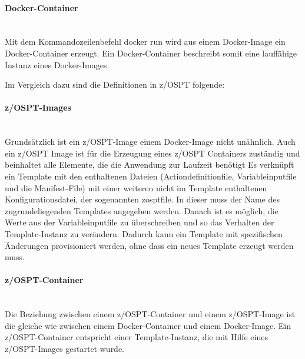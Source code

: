 \paragraph{\glqq Docker-Container\grqq}~\\
Mit dem Kommandozeilenbefehl \glqq docker run\grqq{} wird aus einem Docker-Image ein Docker-Container erzeugt.
Ein Docker-Container beschreibt somit eine lauffähige Instanz eines Docker-Images.
\cite[Kap. 1]{Vohra.2016}

Im Vergleich dazu sind die Definitionen in z/OSPT folgende:

\paragraph{\glqq z/OSPT-Images\grqq}~\\
Grundsätzlich ist ein z/OSPT-Image einem Docker-Image nicht unähnlich.
Auch ein z/OSPT Image ist für die Erzeugung eines z/OSPT Containers zuständig und beinhaltet alle Elemente, die die Anwendung zur Laufzeit benötigt
Es verknüpft ein Template mit den enthaltenen Dateien (Actiondefinitionfile, Variableinputfile und die Manifest-File) mit einer weiteren nicht im Template enthaltenen Konfigurationsdatei, der sogenannten \glqq zosptfile\grqq.
In dieser muss der Name des zugrundeliegenden Templates angegeben werden.
Danach ist es möglich, die Werte aus der Variableinputfile zu überschreiben und so das Verhalten der Template-Instanz zu verändern.
Dadurch kann ein Template mit spezifischen Änderungen provisioniert werden, ohne dass ein neues Template erzeugt werden muss.

\paragraph{\glqq z/OSPT-Container\grqq}~\\
Die Beziehung zwischen einem z/OSPT-Container und einem z/OSPT-Image ist die gleiche wie zwischen einem Docker-Container und einem Docker-Image.
Ein z/OSPT-Container entspricht einer Template-Instanz, die mit Hilfe eines z/OSPT-Images gestartet wurde.

